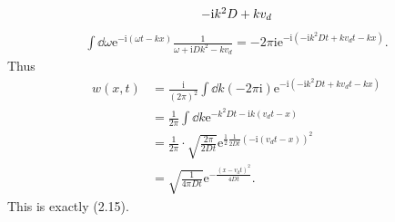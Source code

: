 \documentclass[hyperref, a4paper]{article}
\newcommand*{\ii}{\mathrm{i}}
\newcommand*{\ee}{\mathrm{e}}
\begin{document}
\begin{itemize}
\[\begin{tikzpicture}[x=0.75pt,y=0.75pt,yscale=-1,xscale=1]
        \draw (250,144.4) node [anchor=north west][inner sep=0.75pt]    {$-\ii k^{2} D+kv_{d}$};
        
        
        \end{tikzpicture}    
\]
\[
    \begin{aligned}
        \int \dd{\omega} \ee^{- \ii (\omega t - k x)} \frac{1}{\omega + \ii D k^2 - k v_d} = - 2\pi \ii \ee^{- \ii ( - \ii k^2 D t + k v_d t - kx )}.
    \end{aligned}
\]
Thus 
\[
    \begin{aligned}
        w(x, t) &= \frac{\ii}{(2\pi)^2} \int \dd{k} (- 2\pi \ii) \ee^{- \ii ( - \ii k^2 D t + k v_d t - kx )} \\
        &= \frac{1}{2\pi} \int \dd{k} \ee^{- k^2 D t - \ii k (v_d t - x)} \\
        &= \frac{1}{2\pi} \cdot \sqrt{\frac{2\pi}{2 D t}} \ee^{\frac{1}{2} \frac{1}{2 D t} (- \ii (v_d t - x))^2} \\
        &= \sqrt{\frac{1}{4 \pi D t}} \ee^{- \frac{(x - v_d t)^2}{4 D t}} .
    \end{aligned}
\]
This is exactly (2.15).

\end{itemize}
\end{document}
